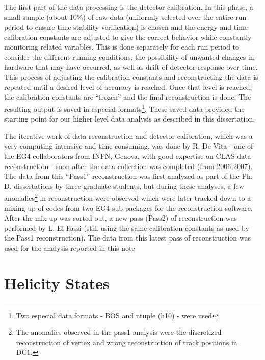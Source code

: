 The first part of the data processing is the detector calibration. In this phase, a small sample (about 10\%) of raw data (uniformly selected over the entire run period to ensure time stability verification) is chosen and the energy and time calibration constants are adjusted to give the correct behavior while constantly monitoring related variables. This is done separately for each run period to consider the different running conditions, the possibility of unwanted changes in hardware that may have occurred, as well as drift of detector response over time. This process of adjusting the calibration constants and reconstructing the data is repeated until a desired level of accuracy is reached. Once that level is reached, the calibration constants are ``frozen'' and the final reconstruction is done. The resulting output is saved in especial formats\footnote{Two especial data formats - BOS and ntuple (h10) - were used}.
These saved data provided the starting point for our higher level data analysis as described in this dissertation. %

The iterative work of data reconstruction and detector calibration, which was a very computing intensive and time consuming, was done by R. De Vita - one of the EG4 collaborators from  INFN, Genova, with good expertise on CLAS data reconstruction - soon after the data collection was completed (from 2006-2007). The data from this ``Pass1'' reconstruction was first analyzed as part of the Ph. D. dissertations by three graduate students, but during these analyses, a few anomalies\footnote{The anomalies observed in the pass1 analysis were the discretized reconstruction of vertex and wrong reconstruction of track positions in DC1.} in reconstruction were observed which were later tracked down to a %
mixing up of codes from two EG4 sub-packages for the reconstruction software. After the mix-up was sorted out, a new pass (Pass2) of reconstruction was performed by L. El Fassi (still using the same calibration constants as used by the Pass1 reconstruction). The data from this latest pass of reconstruction was used for the analysis reported in this note 


\section{Helicity States}

